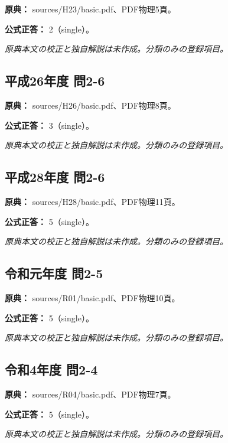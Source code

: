 \noindent\textbf{原典：} sources/H23/basic.pdf、PDF物理5頁。

\textbf{公式正答：} 2（single）。

\par\textit{原典本文の校正と独自解説は未作成。分類のみの登録項目。}

\subsection{平成26年度 問2-6}
\label{q:h26-reg-basic-2-6}

\noindent\textbf{原典：} sources/H26/basic.pdf、PDF物理8頁。

\textbf{公式正答：} 3（single）。

\par\textit{原典本文の校正と独自解説は未作成。分類のみの登録項目。}

\subsection{平成28年度 問2-6}
\label{q:h28-reg-basic-2-6}

\noindent\textbf{原典：} sources/H28/basic.pdf、PDF物理11頁。

\textbf{公式正答：} 5（single）。

\par\textit{原典本文の校正と独自解説は未作成。分類のみの登録項目。}

\subsection{令和元年度 問2-5}
\label{q:r01-reg-basic-2-5}

\noindent\textbf{原典：} sources/R01/basic.pdf、PDF物理10頁。

\textbf{公式正答：} 5（single）。

\par\textit{原典本文の校正と独自解説は未作成。分類のみの登録項目。}

\subsection{令和4年度 問2-4}
\label{q:r04-reg-basic-2-4}

\noindent\textbf{原典：} sources/R04/basic.pdf、PDF物理7頁。

\textbf{公式正答：} 5（single）。

\par\textit{原典本文の校正と独自解説は未作成。分類のみの登録項目。}

